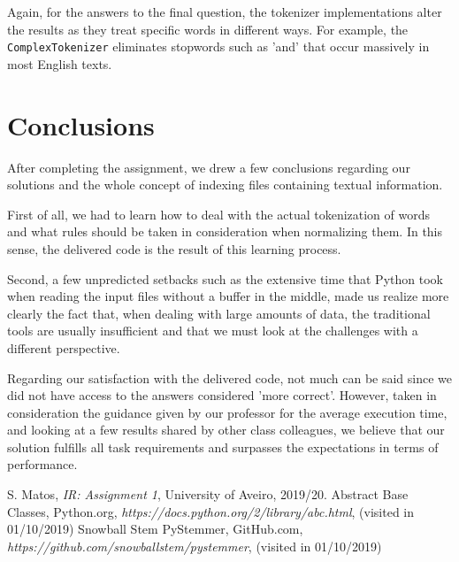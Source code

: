 \documentclass[12pt]{article}
\begin{document}
Again, for the answers to the final question, the tokenizer implementations
alter the results as they treat specific words in different ways.
For example, the \texttt{ComplexTokenizer} eliminates stopwords such as 'and'
that occur massively in most English texts.

\newpage
\section*{Conclusions}

After completing the assignment, we drew a few conclusions regarding our
solutions and the whole concept of indexing files containing textual information.

First of all, we had to learn how to deal with the actual tokenization of 
words and what rules should be taken in consideration when normalizing them.
In this sense, the delivered code is the result of this learning process.

Second, a few unpredicted setbacks such as the extensive time that Python 
took when reading the input files without a buffer in the middle, made us 
realize more clearly the fact that, when dealing with large amounts of data,
the traditional tools are usually insufficient and that we must look at the 
challenges with a different perspective.

Regarding our satisfaction with the delivered code, not much can be said
since we did not have access to the answers considered 'more correct'.
However, taken in consideration the guidance given by our professor for 
the average execution time, and looking at a few results shared by other 
class colleagues, we believe that our solution fulfills all task requirements
and surpasses the expectations in terms of performance.

\begin{thebibliography}{9}
  

    S. Matos,
    \textit{IR: Assignment 1},
    University of Aveiro,
    2019/20.
    Abstract Base Classes,
    Python.org,
    \textit{https://docs.python.org/2/library/abc.html},
    (visited in 01/10/2019)
    Snowball Stem PyStemmer,
    GitHub.com,
    \textit{https://github.com/snowballstem/pystemmer},
    (visited in 01/10/2019)
  
\end{thebibliography}

\clearpage
\end{document}
